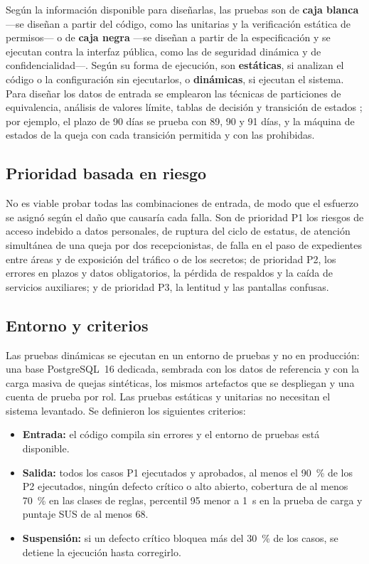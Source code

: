 	Según la información disponible para diseñarlas, las pruebas son de \textbf{caja blanca} ---se
	diseñan a partir del código, como las unitarias y la verificación estática de permisos--- o de
	\textbf{caja negra} ---se diseñan a partir de la especificación y se ejecutan contra la interfaz
	pública, como las de seguridad dinámica y de confidencialidad---. Según su forma de ejecución, son
	\textbf{estáticas}, si analizan el código o la configuración sin ejecutarlos, o
	\textbf{dinámicas}, si ejecutan el sistema. Para diseñar los datos de entrada se emplearon las
	técnicas de particiones de equivalencia, análisis de valores límite, tablas de decisión y transición
	de estados \cite{myers_testing}; por ejemplo, el plazo de 90 días se prueba con 89, 90 y 91 días, y
	la máquina de estados de la queja con cada transición permitida y con las prohibidas.

	\subsection{Prioridad basada en riesgo}
	No es viable probar todas las combinaciones de entrada, de modo que el esfuerzo se asignó según el
	daño que causaría cada falla. Son de prioridad P1 los riesgos de acceso indebido a datos personales,
	de ruptura del ciclo de estatus, de atención simultánea de una queja por dos recepcionistas, de falla
	en el paso de expedientes entre áreas y de exposición del tráfico o de los secretos; de prioridad
	P2, los errores en plazos y datos obligatorios, la pérdida de respaldos y la caída de servicios
	auxiliares; y de prioridad P3, la lentitud y las pantallas confusas.

	\subsection{Entorno y criterios}
	Las pruebas dinámicas se ejecutan en un entorno de pruebas y no en producción: una base PostgreSQL~16
	dedicada, sembrada con los datos de referencia y con la carga masiva de quejas sintéticas, los mismos
	artefactos que se despliegan y una cuenta de prueba por rol. Las pruebas estáticas y unitarias no
	necesitan el sistema levantado. Se definieron los siguientes criterios:

	\begin{itemize}
		\item \textbf{Entrada:} el código compila sin errores y el entorno de pruebas está disponible.
		\item \textbf{Salida:} todos los casos P1 ejecutados y aprobados, al menos el 90~\% de los P2
		ejecutados, ningún defecto crítico o alto abierto, cobertura de al menos 70~\% en las clases de
		reglas, percentil 95 menor a 1~s en la prueba de carga y puntaje SUS de al menos 68.
		\item \textbf{Suspensión:} si un defecto crítico bloquea más del 30~\% de los casos, se detiene la
		ejecución hasta corregirlo.
	\end{itemize}


